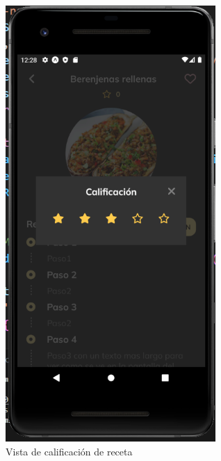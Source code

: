 \begin{figure}[!h]
  \centering
  \includegraphics[width=8cm, scale=1]{Images/Imagenes/inforeceta2.png}
  \caption{Vista de calificación de receta}
  \label{fig:inforeceta2}
\end{figure}

